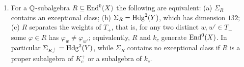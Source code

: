 \begin{proposition}
\begin{enumerate}[label=\textup{(\roman*)},leftmargin=2.6em,itemsep=2pt]
  every homomorphism $Y\to X$ is of this form. For a $\QQ$-subalgebra
  $R\subseteq\End^{0}(X)$ let $\Sigma_{R}\subseteq\Hdg^{2}(Y)$ be the
  $\QQ$-span of the products of two divisor classes of $Y$ and of the classes
  $f_{\varphi,\psi}^{*}\HW(X)$ with $\varphi,\psi\in R$. Then
  $\Sigma_{k_{c}}=\Sigma_{\QQ}$, the span obtained from the maps
  $(x,y)\mapsto ax+by$ alone, has dimension $110$ and meets the span of
  $\pi_{0},\pi_{12},\pi_{13},\pi_{23}$ in the plane of the classes with
  $a_{1}=a_{2}=a_{3}$; it contains no exceptional class.
\item For a $\QQ$-subalgebra $R\subseteq\End^{0}(X)$ the following are
  equivalent: \textup{(a)} $\Sigma_{R}$ contains an exceptional class;
  \textup{(b)} $\Sigma_{R}=\mathrm{Hdg}^{2}(Y)$, which has dimension $132$;
  \textup{(c)} $R$ separates the weights of $T_{+}$, that is, for any two
  distinct $w,w'\in T_{+}$ some $\varphi\in R$ has
  $\varphi_{w}\ne\varphi_{w'}$; equivalently, $R$ and $k_{c}$ generate
  $\operatorname{End}^{0}(X)$. In particular $\Sigma_{K_{c}^{+}}=\mathrm{Hdg}^{2}(Y)$, while
  $\Sigma_{R}$ contains no exceptional class if $R$ is a proper subalgebra
  of $K_{c}^{+}$ or a subalgebra of $k_{c}$.
\end{enumerate}
\end{proposition}

